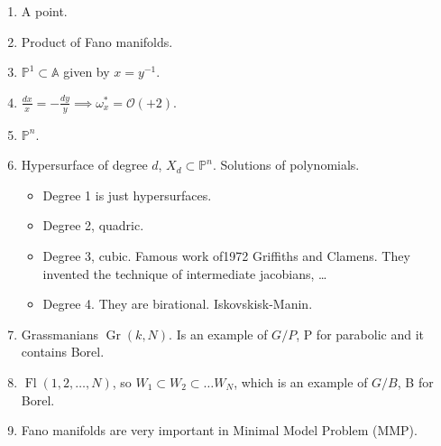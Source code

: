 \documentclass{article}
\numberwithin{equation}{section}
\newcommand{\A}{\mathbb{A}}
\renewcommand{\P}{\mathbb{P}}
\newcommand{\Oc}{\mathcal{O}}
\DeclareMathOperator{\Fl}{Fl}
\DeclareMathOperator{\Gr}{Gr}
\begin{document}
	\begin{examples}\leavevmode
		\begin{enumerate}
			\item A point.
			\item Product of Fano manifolds.
			\item $\P^1\subset\A$ given by $x=y^{-1}$.
			\item $\frac{dx}{x}=-\frac{dy}{y}\implies \omega^*_x=\Oc(+2)$.
			\item $\P^n$.
			\item Hypersurface of degree $d$, $X_d\subset\P^n$. Solutions of polynomials.
			\begin{itemize}
				\item Degree 1 is just hypersurfaces.
				\item Degree 2, quadric.
				\item Degree 3, cubic. Famous work of1972 Griffiths and Clamens. They invented the technique of intermediate jacobians, …
				\item Degree 4. They are birational. Iskovskisk-Manin.
			\end{itemize}
			\item Grassmanians $\Gr(k,N)$. Is an example of $G/P$, P for parabolic and it contains Borel.
			\item $\Fl(1,2,\ldots,N)$, so $W_1\subset W_2\subset\ldots W_N$, which is an example of $G/B$, B for Borel.
			\item Fano manifolds are very important in Minimal Model Problem (MMP).
		\end{enumerate}
	\end{examples}
	
\end{document}
